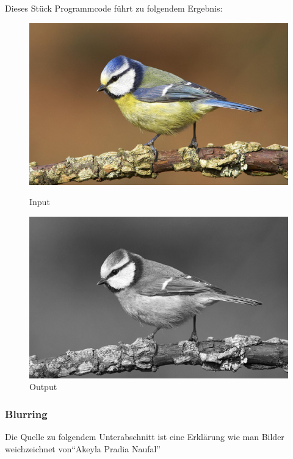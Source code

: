 Dieses Stück Programmcode führt zu folgendem Ergebnis:

\begin{figure}[htb]
  \centering
  \begin{minipage}[t]{0.45\linewidth}
    \centering
    \includegraphics[width=\linewidth]{pics/bildverarbeitungsalgos/input.png}
    \caption{Input \cite{maai:input:cite}}
    \label{maai:grayscaling:input}
  \end{minipage}
  \hfill
  \begin{minipage}[t]{0.45\linewidth}
    \centering
    \includegraphics[width=\linewidth]{pics/bildverarbeitungsalgos/grayscaling_output.png}
    \caption{Output}
    \label{maai:grayscaling:output}
  \end{minipage}
\end{figure}

\subsubsection{Blurring}\label{maai:blurring}
Die Quelle zu folgendem Unterabschnitt ist eine Erklärung wie man Bilder weichzeichnet von``Akeyla Pradia Naufal'' \cite{blurring:cite}

